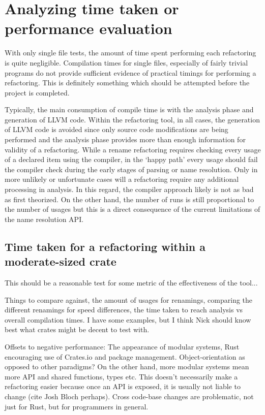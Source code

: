 
\section{Analyzing time taken or performance evaluation}
With only single file tests, the amount of time spent performing each refactoring is quite negligible. Compilation times for single files, especially of fairly trivial programs do not provide sufficient evidence of practical timings for performing a refactoring. This is definitely something which should be attempted before the project is completed.

Typically, the main consumption of compile time is with the analysis phase and generation of LLVM code. Within the refactoring tool, in all cases, the generation of LLVM code is avoided since only source code modifications are being performed and the analysis phase provides more than enough information for validity of a refactoring. While a rename refactoring requires checking every usage of a declared item using the compiler, in the `happy path' every usage should fail the compiler check during the early stages of parsing or name resolution. Only in more unlikely or unfortunate cases will a refactoring require any additional processing in analysis. In this regard, the compiler approach likely is not as bad as first theorized. On the other hand, the number of runs is still proportional to the number of usages but this is a direct consequence of the current limitations of the name resolution API.

\subsection{Time taken for a refactoring within a moderate-sized crate}
This should be a reasonable test for some metric of the effectiveness of the tool...

Things to compare against, the amount of usages for renamings, comparing the different renamings for speed differences, the time taken to reach analysis vs overall compilation times. 
I have some examples, but I think Nick should know best what crates might be decent to test with.

Offsets to negative performance:
The appearance of modular systems, Rust encouraging use of Crates.io and package management. Object-orientation as opposed to other paradigms? On the other hand, more modular systems mean more API and shared functions, types etc. This doesn't necessarily make a refactoring easier because once an API is exposed, it is usually not liable to change (cite Josh Bloch perhaps). Cross code-base changes are problematic, not just for Rust, but for programmers in general.

